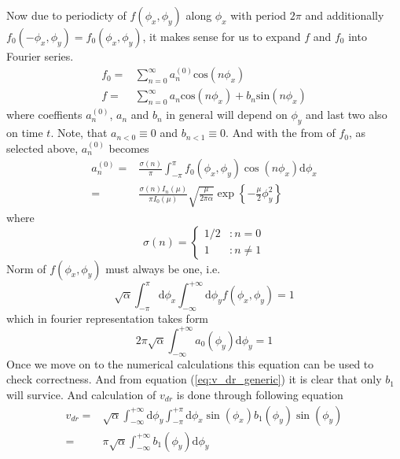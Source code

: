 \documentclass[40pt,letterpaper,physrev]{article}
\begin{document}
	Now due to periodicty of $f(\phi_x,\phi_y)$ along $\phi_x$ with 
	period $2\pi$ and additionally 
	$f_0(-\phi_x, \phi_y)=f_0(\phi_x, \phi_y)$, it makes sense 
	for us to expand $f$ and $f_0$ into Fourier series.
	\begin{align}
		f_0=&\sum^\infty_{n=0}a^{(0)}_{n}\text{cos}(n\phi_x)\label{eq:f0_fourier_representation} \\
		f=&\sum^\infty_{n=0}a_{n}\text{cos}(n\phi_x)+
		b_{n}\text{sin}(n\phi_x)\label{eq:f_fourier_representation}
	\end{align}
	where coeffients $a^{(0)}_n$, $a_n$ and $b_n$ in general will depend on $\phi_y$ and last two also on time $t$. Note, that $a_{n<0}\equiv 0$ and $b_{n<1}\equiv 0$. And with the from of $f_0$, as selected above, $a^{(0)}_n$ becomes
	\begin{align}
		a^{(0)}_n=&\frac{\sigma(n)}{\pi}\int^{\pi}_{-\pi}f_0(\phi_x,\phi_y)\cos(n\phi_x)\text{d}\phi_x \\
		=&\frac{\sigma(n)I_n(\mu)}{\pi I_0(\mu)}\sqrt{\frac{\mu}{2\pi\alpha}}\exp{\left \{ -\frac{\mu}{2}\phi^2_y\right \} }
	\end{align}
	where 
	\begin{equation}
		\sigma(n)=
		\begin{cases}
   		1/2 & : n=0 \\
   		1 & : n\ne 1
  		\end{cases}
	\end{equation}
	Norm of $f(\phi_x,\phi_y)$ must always be one, i.e.
	\begin{equation}
		\sqrt{\alpha}\int^{\pi}_{-\pi}\text{d}\phi_x
			\int^{+\infty}_{-\infty}\text{d}\phi_y f(\phi_x,\phi_y)=1
	\end{equation}
	which in fourier representation takes form
	\begin{equation}
	\boxed{
		2\pi\sqrt{\alpha}\int^{+\infty}_{-\infty}a_0(\phi_y)\text{d}
		\phi_y=1}
	\end{equation}
	Once we move on to the numerical calculations this equation can be used to check correctness. And from equation (\ref{eq:v_dr_generic}) it is clear that only $b_1$ will survice. And calculation of $v_{dr}$ is done through following 
	equation
	\begin{align}
		v_{dr}=&\sqrt{\alpha}\int^{+\infty}_{-\infty}\text{d}\phi_{y}\int^{+\pi}_{-\pi}\text{d}\phi_x\sin(\phi_x)b_1(\phi_y)\sin(\phi_y)\\
		=&\pi\sqrt{\alpha}\int^{+\infty}_{-\infty}b_1(\phi_y)\text{d}\phi_y
	\end{align}
\end{document}
